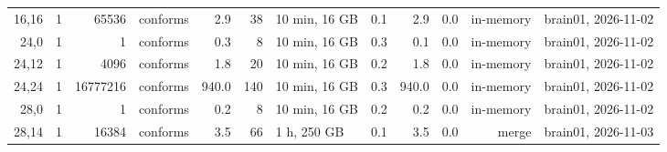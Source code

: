 \documentclass[10pt]{article}
\begin{document}
\begin{longtable}{@{}rrrlrrlrrrrl@{}}
\color{red} 16,16 & 1 & 65536 & conforms & 2.9 & 38 & 10 min, 16 GB & 0.1 & 2.9 & 0.0 & in-memory & brain01, 2026-11-02 \\
\color{red} 24,0 & 1 & 1 & conforms & 0.3 & 8 & 10 min, 16 GB & 0.3 & 0.1 & 0.0 & in-memory & brain01, 2026-11-02 \\
\color{red} 24,12 & 1 & 4096 & conforms & 1.8 & 20 & 10 min, 16 GB & 0.2 & 1.8 & 0.0 & in-memory & brain01, 2026-11-02 \\
\color{red} 24,24 & 1 & 16777216 & conforms & 940.0 & 140 & 10 min, 16 GB & 0.3 & 940.0 & 0.0 & in-memory & brain01, 2026-11-02 \\
\color{red} 28,0 & 1 & 1 & conforms & 0.2 & 8 & 10 min, 16 GB & 0.2 & 0.2 & 0.0 & in-memory & brain01, 2026-11-02 \\
\color{blue} 28,14 & 1 & 16384 & conforms & 3.5 & 66 & 1 h, 250 GB & 0.1 & 3.5 & 0.0 & merge & brain01, 2026-11-03 \\
\bottomrule
\end{longtable}
\end{document}

